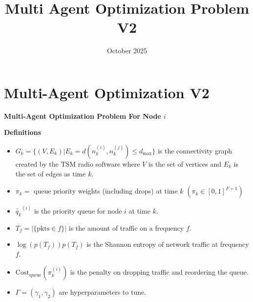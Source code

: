 \documentclass{article}
\title{Multi Agent Optimization Problem V2}
\date{October 2025}
\begin{document}
\section{Multi-Agent Optimization V2}

\noindent \textbf{Multi-Agent Optimization Problem For Node $i$}
\\
\noindent{}

\vspace{1 cm}


\textbf{Definitions}
\begin{itemize}
    \item $G_{k} = \{ (V, E_{k}) | E_{k} = d(n_{k}^{(i)}, n_{k}^{(j)}) \le d_{\text{max}} \}$ is the connectivity graph created by the TSM radio software where $V$ is the set of vertices and $E_{k}$ is the set of edges as time $k$.
    \item $\pi_{k} =$ queue priority weights (including drops) at time $k$ $(\pi_{k} \in [0, 1]^{F+1})$
    \item $\tilde{q_{k}}^{(i)}$ is the priority queue for node $i$ at time $k$.
    \item $T_{f} = | \{ \text{pkts} \in f\} |$ is the amount of traffic on a frequency $f$.
    \item $\log(p(T_{f})) p(T_{f})$ is the Shannon entropy of network traffic at frequency $f$.
    \item $\text{Cost}_{\text{queue}}(\pi_{k}^{(i)})$ is the penalty on dropping traffic and reordering the queue.
    \item $\Gamma = (\gamma_{1}, \gamma_{2})$ are hyperparameters to tune.
\end{itemize}


\vspace{1 cm}
\end{document}
